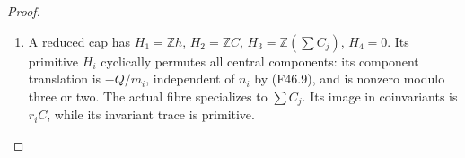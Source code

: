 \begin{proof}
\begin{enumerate}[label=\arabic*.]
\par\medskip\noindent\textbf{The cap specializations.}
A good cap has
$H_1=\mathbb Zh\oplus\mathbb Z/p$, $H_2=\mathbb ZC$,
$H_3=\mathbb Z(Ch)$, $H_4=0$, with $p=3$ or two.
Actual smooth-root transport sends the generic fibre to its
central elliptic fibre with degree one. The same transport is
the identity on the elliptic lattice. If $nu+mv=1$, then $u$
is prime to the deck order and
\[
                    (D^u-I)\Lambda=(D-I)\Lambda.
\]
For order three this follows from $D+I=-D^2$; for order four
the relevant odd powers are $D$ or $D^{-1}$.
The multiplying matrices are unimodular. Thus the incoming
finite torsion maps isomorphically to cap torsion, and the
incoming full elliptic group maps onto the cap elliptic lattice.

\item A reduced cap has $H_1=\mathbb Zh$, $H_2=\mathbb ZC$,
$H_3=\mathbb Z(\sum C_j)$, $H_4=0$.
Its primitive $H_i$ cyclically permutes all central components:
its component translation is $-Q/m_i$, independent of $n_i$
by (F46.9), and is nonzero modulo three or two.
The actual fibre specializes to $\sum C_j$. Its image in
coinvariants is $r_iC$, while its invariant trace is primitive.


\end{enumerate}
\end{proof}
